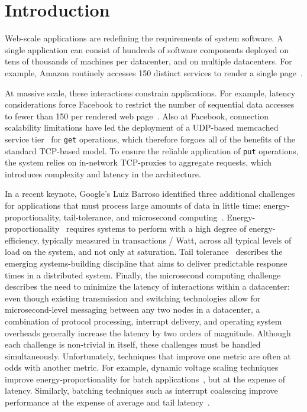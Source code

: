 
\section{Introduction}
\label{sec:intro}


Web-scale applications are redefining the requirements of system
software.  A single application can consist of hundreds of software
components deployed on tens of thousands of machines per datacenter,
and on multiple datacenters.  For example, Amazon routinely accesses
150 distinct services to render a single
page~\cite{DBLP:conf/sosp/DeCandiaHJKLPSVV07}.  

At massive scale, these interactions constrain applications.  For
example, latency considerations force Facebook to restrict the number
of sequential data accesses to fewer than 150 per rendered web
page~\cite{rumble2011s}.  Also at Facebook, connection scalability
limitations have led the deployment of a UDP-based memcached service
tier~\cite{nishtala2013scaling} for \texttt{get} operations, which
therefore forgoes all of the benefits of the standard TCP-based model.
To ensure the reliable application of \texttt{put} operations, the
system relies on in-network TCP-proxies to aggregate requests, which
introduces complexity and latency in the architecture.

In a recent keynote, Google's Luiz Barroso identified three additional challenges
for applications that must process large amounts of data in little
time: energy-proportionality, tail-tolerance, and microsecond
computing~\cite{luiz-isscc}.
Energy-proportionality~\cite{DBLP:journals/computer/BarrosoH07}
requires systems to perform with a high degree of energy-efficiency,
typically measured in transactions / Watt, across all typical levels
of load on the system, and not only at saturation. Tail
tolerance~\cite{DBLP:journals/cacm/DeanB13} describes the emerging
systems-building discipline that aims to deliver predictable response
times in a distributed system.  Finally, the microsecond computing
challenge describes the need to minimize the latency of interactions
within a datacenter: even though existing transmission and switching
technologies allow for microsecond-level messaging between any two
nodes in a datacenter, a combination of protocol processing, interrupt
delivery, and operating system overheads generally increase the
latency by two orders of magnitude.  Although each challenge is
non-trivial in itself, these challenges must be handled
simultaneously.  Unfortunately, techniques that improve one metric are
often at odds with another metric.  For example, dynamic voltage
scaling techniques improve energy-proportionality for batch
applications~\cite{DBLP:conf/asplos/DelimitrouK14}, but at the
expense of latency.  Similarly, batching techniques such as interrupt
coalescing improve performance at the expense of average and tail
latency~\cite{missing}.

